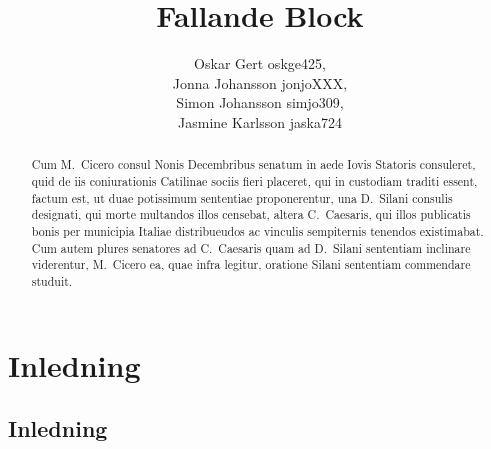 \documentclass[a4paper,12pt,twoside,swedish]{report}
\begin{document}
\pagestyle{empty}

\title{Fallande Block}
\author{Oskar Gert oskge425, \\ Jonna Johansson jonjoXXX, \\Simon Johansson simjo309,\\ Jasmine Karlsson jaska724}
\date{}

\maketitle

\begin{abstract}
Cum M.~Cicero consul Nonis Decembribus senatum in aede
Iovis Statoris consuleret, quid de iis coniurationis Catilinae
sociis fieri placeret, qui in custodiam traditi essent, factum
est, ut duae potissimum sententiae proponerentur, una D.~Silani consulis
designati, qui morte multandos illos censebat,
altera C.~Caesaris, qui illos publicatis bonis per municipia
Italiae distribueudos ac vinculis sempiternis tenendos existimabat. Cum
autem plures senatores ad C.~Caesaris quam ad
D.~Silani sententiam inclinare viderentur, M.~Cicero ea, quae
infra legitur, oratione Silani sententiam commendare studuit.
\vfill
\end{abstract}

\tableofcontents  %
\listoffigures    %
\listoftables     %


\pagestyle{plain}

\chapter{Inledning}
\setcounter{page}{1}

\section{Inledning}
\end{document}

